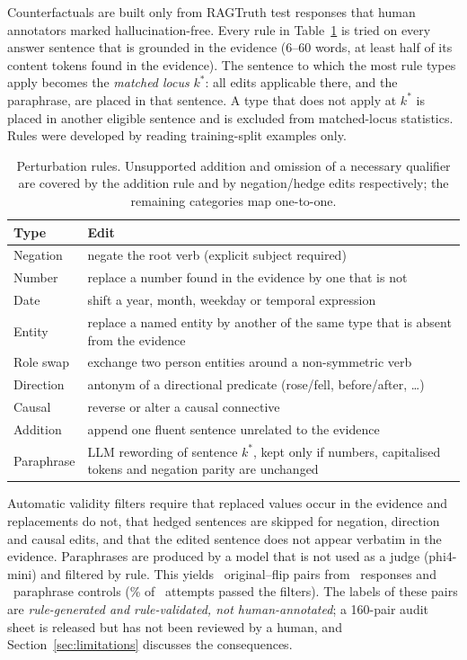Counterfactuals are built only from RAGTruth test responses that human annotators marked hallucination-free. Every rule in Table~\ref{tab:rules} is tried on every answer sentence that is grounded in the evidence (6--60 words, at least half of its content tokens found in the evidence). The sentence to which the most rule types apply becomes the \emph{matched locus} $k^\ast$: all edits applicable there, and the paraphrase, are placed in that sentence. A type that does not apply at $k^\ast$ is placed in another eligible sentence and is excluded from matched-locus statistics. Rules were developed by reading training-split examples only.

\begin{table}[t]
\centering\small
\begin{tabular}{p{}p{}}
\toprule
Type & Edit \\
\midrule
Negation & negate the root verb (explicit subject required) \\
Number & replace a number found in the evidence by one that is not \\
Date & shift a year, month, weekday or temporal expression \\
Entity & replace a named entity by another of the same type that is absent from the evidence \\
Role swap & exchange two person entities around a non-symmetric verb \\
Direction & antonym of a directional predicate (rose/fell, before/after, \ldots) \\
Causal & reverse or alter a causal connective \\
Addition & append one fluent sentence unrelated to the evidence \\
\midrule
Paraphrase & LLM rewording of sentence $k^\ast$, kept only if numbers, capitalised tokens and negation parity are unchanged \\
\bottomrule
\end{tabular}
\caption{Perturbation rules. Unsupported addition and omission of a necessary qualifier are covered by the addition rule and by negation/hedge edits respectively; the remaining categories map one-to-one.}
\label{tab:rules}
\end{table}

Automatic validity filters require that replaced values occur in the evidence and replacements do not, that hedged sentences are skipped for negation, direction and causal edits, and that the edited sentence does not appear verbatim in the evidence. Paraphrases are produced by a model that is not used as a judge (phi4-mini) and filtered by rule. This yields \NCfPairs\ original--flip pairs from \NCfBases\ responses and \NCfPara\ paraphrase controls (\CfParaKeptPct\% of \NCfParaAttempted\ attempts passed the filters). The labels of these pairs are \emph{rule-generated and rule-validated, not human-annotated}; a 160-pair audit sheet is released but has not been reviewed by a human, and Section~\ref{sec:limitations} discusses the consequences.

